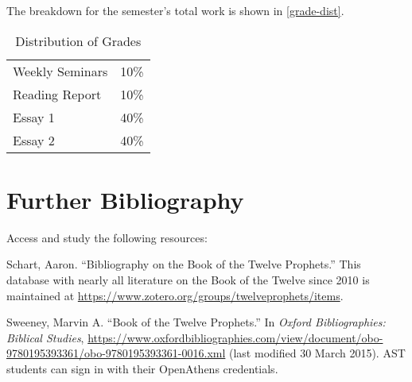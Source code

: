 \documentclass[titlepage]{article}
\newcommand\policy{../policy}
\begin{document}
The breakdown for the semester's total work is shown in
\autoref{grade-dist}.

\begin{table}[htbp]
  \centering
  {\lining
  \begin{tabular}{lr}
    \toprule
    Weekly Seminars & 10\% \\
    Reading Report  & 10\% \\
    Essay 1         & 40\% \\
    Essay 2         & 40\% \\
    \bottomrule
  \end{tabular}}
  \caption{Distribution of Grades}
  \label{grade-dist}
\end{table}




\section{Further Bibliography}
\label{bib}

Access and study the following resources:

Schart, Aaron. “Bibliography on the Book of the Twelve Prophets.” This database with nearly all literature on the Book of the Twelve since 2010 is maintained at \url{https://www.zotero.org/groups/twelveprophets/items}.

Sweeney, Marvin A. “Book of the Twelve Prophets.” In \emph{Oxford Bibliographies: Biblical Studies}, \href{https://go.openathens.net/redirector/astheology.ns.ca?url=https://www.oxfordbibliographies.com/view/document/obo-9780195393361/obo-9780195393361-0016.xml}{https://www.oxfordbibliographies.com/view/document/obo-9780195393361/obo-9780195393361-0016.xml} (last modified 30 March 2015). AST students can sign in with their OpenAthens credentials.
\end{document}
